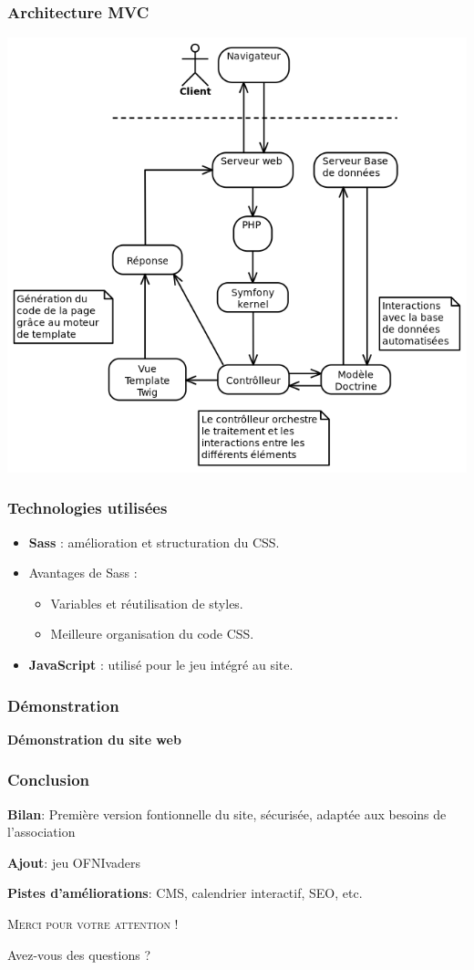 \documentclass[pdf]{beamer}
\begin{document}
\begin{frame}
    \frametitle{Architecture MVC}

    \centering
    \includegraphics[width=0.7\linewidth]{../0-report/assets/pictures/mvc.png}
\end{frame}

\begin{frame}
    \frametitle{Technologies utilisées}

    \begin{itemize}
        \item \textbf{Sass} : amélioration et structuration du CSS.
        \item Avantages de Sass :
              \begin{itemize}
                \item Variables et réutilisation de styles.
                \item Meilleure organisation du code CSS.
              \end{itemize}
        \item \textbf{JavaScript} : utilisé pour le jeu intégré au site.
    \end{itemize}
\end{frame}




\begin{frame}
    \frametitle{Démonstration}
    \centering
    \textbf{Démonstration du site web}
\end{frame}

\begin{frame}
    \frametitle{Conclusion}
    \centering
    \textbf{Bilan}: Première version fontionnelle du site, sécurisée, adaptée aux besoins de l’association
    \vspace{1cm}

    \textbf{Ajout}: jeu OFNIvaders
    \vspace{1cm}

    \textbf{Pistes d'améliorations}: CMS, calendrier interactif, SEO, etc.
\end{frame}


\appendix
\begin{frame}
    \scshape\huge\centering
    \vspace{1cm}
    Merci pour votre attention !\par
    \vspace{2cm}
    Avez-vous des questions ?\par
\end{frame}
\end{document}
